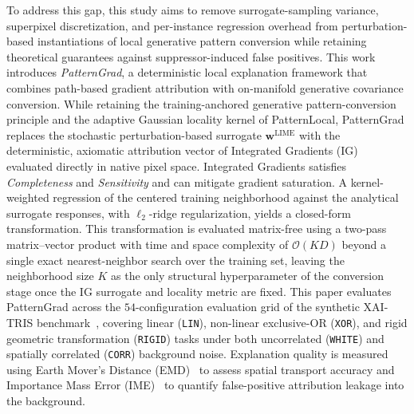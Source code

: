 \documentclass[pdflatex,sn-mathphys-num]{sn-jnl}
\theoremstyle{thmstyleone}
\theoremstyle{thmstyletwo}%
\theoremstyle{thmstylethree}%
\begin{document}
To address this gap, this study aims to remove surrogate-sampling variance, superpixel discretization, and per-instance regression overhead from perturbation-based instantiations of local generative pattern conversion while retaining theoretical guarantees against suppressor-induced false positives. This work introduces \emph{PatternGrad}, a deterministic local explanation framework that combines path-based gradient attribution with on-manifold generative covariance conversion. While retaining the training-anchored generative pattern-conversion principle and the adaptive Gaussian locality kernel of PatternLocal, PatternGrad replaces the stochastic perturbation-based surrogate $\mathbf{w}^{\text{LIME}}$ with the deterministic, axiomatic attribution vector of Integrated Gradients (IG)~\cite{sundararajan2017} evaluated directly in native pixel space. Integrated Gradients satisfies \emph{Completeness} and \emph{Sensitivity} and can mitigate gradient saturation. A kernel-weighted regression of the centered training neighborhood against the analytical surrogate responses, with $\ell_2$-ridge regularization, yields a closed-form transformation. This transformation is evaluated matrix-free using a two-pass matrix--vector product with time and space complexity of $\mathcal{O}(KD)$ beyond a single exact nearest-neighbor search over the training set, leaving the neighborhood size $K$ as the only structural hyperparameter of the conversion stage once the IG surrogate and locality metric are fixed. This paper evaluates PatternGrad across the $54$-configuration evaluation grid of the synthetic XAI-TRIS benchmark~\cite{clark2024}, covering linear (\texttt{LIN}), non-linear exclusive-OR (\texttt{XOR}), and rigid geometric transformation (\texttt{RIGID}) tasks under both uncorrelated (\texttt{WHITE}) and spatially correlated (\texttt{CORR}) background noise. Explanation quality is measured using Earth Mover's Distance (EMD)~\cite{bonneel2011, clark2024} to assess spatial transport accuracy and Importance Mass Error (IME)~\cite{arras2022, clark2024} to quantify false-positive attribution leakage into the background.
\end{document}

